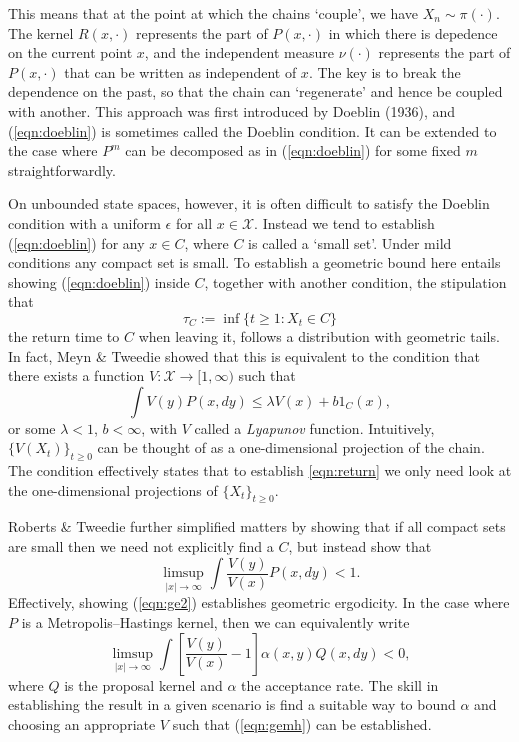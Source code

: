 \documentclass{article}
\newcommand{\ch}[1]{ \{#1_t\}_{t \geq 0} }
\newcommand{\X}{\mathcal{X}}
\begin{document}
This means that at the point at which the chains `couple', we have $X_n \sim \pi(\cdot)$.  The kernel $R(x,\cdot)$ represents the part of $P(x,\cdot)$ in which there is depedence on the current point $x$, and the independent measure $\nu(\cdot)$ represents the part of $P(x,\cdot)$ that can be written as independent of $x$.  The key is to break the dependence on the past, so that the chain can `regenerate' and hence be coupled with another.  This approach was first introduced by Doeblin (1936), and (\ref{eqn:doeblin}) is sometimes called the Doeblin condition.  It can be extended to the case where $P^m$ can be decomposed as in (\ref{eqn:doeblin}) for some fixed $m$ straightforwardly.

On unbounded state spaces, however, it is often difficult to satisfy the Doeblin condition with a uniform $\epsilon$ for all $x \in \X$.  Instead we tend to establish (\ref{eqn:doeblin}) for any $x \in C$, where $C$ is called a `small set'.  Under mild conditions any compact set is small.  To establish a geometric bound here entails showing (\ref{eqn:doeblin}) inside $C$, together with another condition, the stipulation that
\begin{equation} \label{eqn:return}
\tau_C := \inf \{ t \geq 1 : X_t \in C \}
\end{equation}
the return time to $C$ when leaving it, follows a distribution with geometric tails.  In fact, Meyn \& Tweedie showed that this is equivalent to the condition that there exists a function $V: \X \to [1,\infty)$ such that
\begin{equation}
\int V(y)P(x,dy) \leq \lambda V(x) + b1_C(x),
\end{equation}
or some $\lambda<1$, $b < \infty$, with $V$ called a \emph{Lyapunov} function.  Intuitively, $\{ V(X_t) \}_{t \geq 0}$ can be thought of as a one-dimensional projection of the chain.  The condition effectively states that to establish \ref{eqn:return} we only need look at the one-dimensional projections of $\ch{X}$.

Roberts \& Tweedie \cite{} further simplified matters by showing that if all compact sets are small then we need not explicitly find a $C$, but instead show that
\begin{equation} \label{eqn:ge2}
\limsup_{|x| \to \infty} \int \frac{V(y)}{V(x)} P(x,dy) < 1.
\end{equation}
Effectively, showing (\ref{eqn:ge2}) establishes geometric ergodicity.  In the case where $P$ is a Metropolis--Hastings kernel, then we can equivalently write
\begin{equation} \label{eqn:gemh}
\limsup_{|x| \to \infty} \int \left[ \frac{V(y)}{V(x)} - 1 \right] \alpha(x,y)Q(x,dy) < 0,
\end{equation}
where $Q$ is the proposal kernel and $\alpha$ the acceptance rate.  The skill in establishing the result in a given scenario is find a suitable way to bound $\alpha$ and choosing an appropriate $V$ such that (\ref{eqn:gemh}) can be established.
\end{document}
